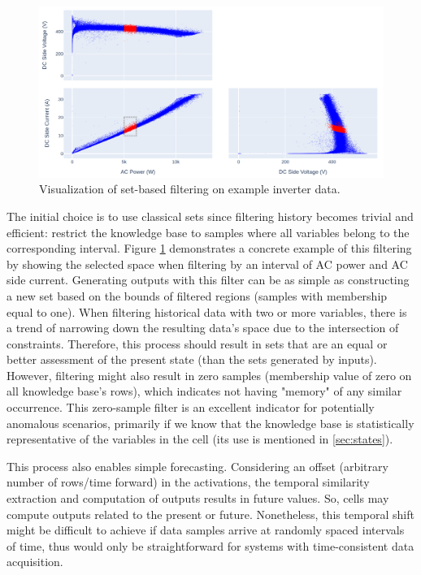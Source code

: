\begin{figure}[h!]
    \centering
    \includegraphics[width=\linewidth]{figures/chapter4/cell/time_extraction.png}
    \caption{Visualization of set-based filtering on example inverter data.}
    \label{fig:time_extraction}
\end{figure}


The initial choice is to use classical sets since filtering history becomes trivial and efficient: restrict the knowledge base to samples where all variables belong to the corresponding interval. Figure \ref{fig:time_extraction} demonstrates a concrete example of this filtering by showing the selected space when filtering by an interval of AC power and AC side current. Generating outputs with this filter can be as simple as constructing a new set based on the bounds of filtered regions (samples with membership equal to one). When filtering historical data with two or more variables, there is a trend of narrowing down the resulting data's space due to the intersection of constraints. Therefore, this process should result in sets that are an equal or better assessment of the present state (than the sets generated by inputs). However, filtering might also result in zero samples (membership value of zero on all knowledge base's rows), which indicates not having "memory" of any similar occurrence. This zero-sample filter is an excellent indicator for potentially anomalous scenarios, primarily if we know that the knowledge base is statistically representative of the variables in the cell (its use is mentioned in \ref{sec:states}).


This process also enables simple forecasting. Considering an offset (arbitrary number of rows/time forward) in the activations, the temporal similarity extraction and computation of outputs results in future values. So, cells may compute outputs related to the present or future. Nonetheless, this temporal shift might be difficult to achieve if data samples arrive at randomly spaced intervals of time, thus would only be straightforward for systems with time-consistent data acquisition.

